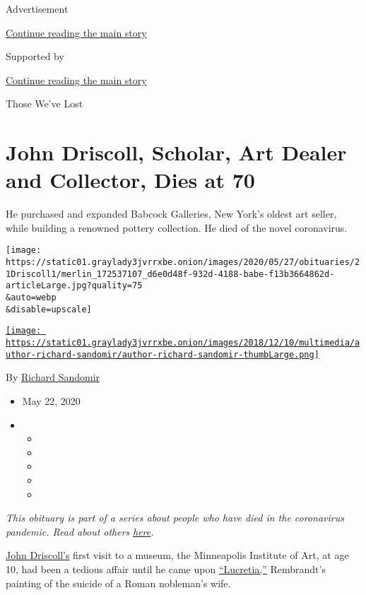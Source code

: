 Advertisement

\protect\hyperlink{after-top}{Continue reading the main story}

Supported by

\protect\hyperlink{after-sponsor}{Continue reading the main story}

Those We've Lost

\hypertarget{john-driscoll-scholar-art-dealer-and-collector-dies-at-70}{%
\section{John Driscoll, Scholar, Art Dealer and Collector, Dies at
70}\label{john-driscoll-scholar-art-dealer-and-collector-dies-at-70}}

He purchased and expanded Babcock Galleries, New York's oldest art
seller, while building a renowned pottery collection. He died of the
novel coronavirus.

\texttt{[image: https://static01.graylady3jvrrxbe.onion/images/2020/05/27/obituaries/21Driscoll1/merlin\_172537107\_d6e0d48f-932d-4188-babe-f13b3664862d-articleLarge.jpg?quality=75\\\&auto=webp\\\&disable=upscale]}

\href{https://www.nytimes3xbfgragh.onion/by/richard-sandomir}{\texttt{[image: https://static01.graylady3jvrrxbe.onion/images/2018/12/10/multimedia/author-richard-sandomir/author-richard-sandomir-thumbLarge.png]}}

By \href{https://www.nytimes3xbfgragh.onion/by/richard-sandomir}{Richard
Sandomir}

\begin{itemize}
\item
  May 22, 2020
\item
  \begin{itemize}
  \item
  \item
  \item
  \item
  \item
  \end{itemize}
\end{itemize}

\emph{This obituary is part of a series about people who have died in
the coronavirus pandemic. Read about others}
\href{https://www.nytimes3xbfgragh.onion/interactive/2020/obituaries/people-died-coronavirus-obituaries.html}{\emph{here}}\emph{.}

\href{http://www.driscollbabcock.com/exhibitions/installation/john-driscoll-1949-2020\#works}{John
Driscoll's} first visit to a museum, the Minneapolis Institute of Art,
at age 10, had been a tedious affair until he came upon
\href{https://collections.artsmia.org/art/529/lucretia-rembrandt-harmensz-van-rijn}{``Lucretia,''}
Rembrandt's painting of the suicide of a Roman nobleman's wife.

